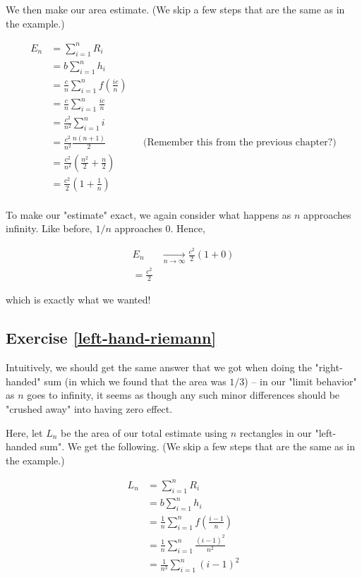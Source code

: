 \documentclass{book}
\begin{document}
We then make our area estimate. (We skip a few steps that are the same as in the example.)

\begin{align*}
E_n &= \sum_{i=1}^n R_i \\
&= b \sum_{i=1}^n h_i \\
&= \frac{c}{n} \sum_{i=1}^n f(\frac{ic}{n}) \\
&= \frac{c}{n} \sum_{i=1}^n \frac{ic}{n} \\
&= \frac{c^2}{n^2} \sum_{i=1}^n i \\
&= \frac{c^2}{n^2} \frac{n(n+1)}{2} && \text{(Remember this from the previous chapter?)} \\
&= \frac{c^2}{n^2} \left( \frac{n^2}{2} + \frac{n}{2} \right) \\
&= \frac{c^2}{2} \left( 1 + \frac{1}{n} \right) \\
\end{align*}

To make our "estimate" exact, we again consider what happens as $n$ approaches infinity. Like before, $1/n$ approaches 0. Hence,

\begin{align*}
E_n &\xrightarrow[n \to \infty]{} \frac{c^2}{2} \left( 1 + 0 \right)  \\
= \frac{c^2}{2}
\end{align*}

which is exactly what we wanted!


\subsection{Exercise \ref{left-hand-riemann}}

Intuitively, we should get the same answer that we got when doing the "right-handed" sum (in which we found that the area was $1/3$) -- in our "limit behavior" as $n$ goes to infinity, it seems as though any such minor differences should be "crushed away" into having zero effect. 



Here, let $L_n$ be the area of our total estimate using $n$ rectangles in our "left-handed sum". We get the following. (We skip a few steps that are the same as in the example.)

\begin{align*}
L_n &= \sum_{i=1}^n R_i \\
&= b \sum_{i=1}^n h_i \\
&= \frac{1}{n} \sum_{i=1}^n f(\frac{i-1}{n}) \\
&= \frac{1}{n} \sum_{i=1}^n \frac{(i-1)^2}{n^2} \\
&= \frac{1}{n^3} \sum_{i=1}^n (i-1)^2 \\
\end{align*}
\end{document}
